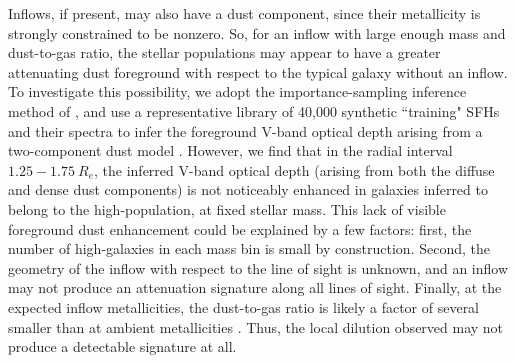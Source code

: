 Inflows, if present, may also have a dust component, since their metallicity is strongly constrained to be nonzero. So, for an inflow with large enough mass and dust-to-gas ratio, the stellar populations may appear to have a greater attenuating dust foreground with respect to the typical galaxy without an inflow. To investigate this possibility, we adopt the importance-sampling inference method of \citet{pace_19a_pca}, and use a representative library of 40,000 synthetic ``training" SFHs and their spectra to infer the foreground V-band optical depth arising from a two-component dust model \citep{charlot_fall_00}. However, we find that in the radial interval $1.25-1.75 ~ R_e$, the inferred V-band optical depth (arising from both the diffuse and dense dust components) is not noticeably enhanced in galaxies inferred to belong to the high-\metdisp population, at fixed stellar mass. This lack of visible foreground dust enhancement could be explained by a few factors: first, the number of high-\metdisp galaxies in each mass bin is small by construction. Second, the geometry of the inflow with respect to the line of sight is unknown, and an inflow may not produce an attenuation signature along all lines of sight. Finally, at the expected inflow metallicities, the dust-to-gas ratio is likely a factor of several smaller than at ambient metallicities \citep{kahre_walterbos_2018_legus_dusttogas}. Thus, the local dilution observed may not produce a detectable signature at all.


